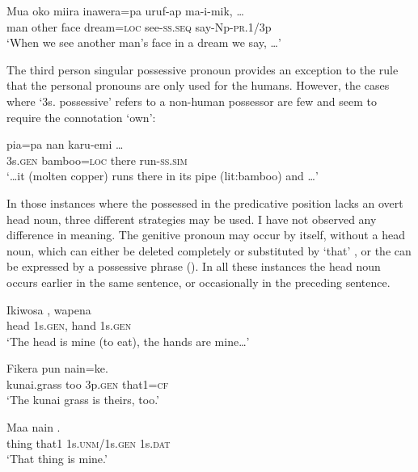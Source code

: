 \ea%
\label{ex:3:x575}
\gll Mua oko miira inawera=pa uruf-ap ma-i-mik, {\dots} \\
man other face dream=\textsc{loc} see-\textsc{ss}.\textsc{seq} say-Np-\textsc{pr}.1/3p\\
\glt`When we see another man's face in a dream we say, {\dots}'
\z

The third person singular possessive pronoun provides an exception to the rule that the personal pronouns are only used for the humans. However, the cases where  `3s. possessive' refers to a non-human possessor are few and seem to require the connotation `own':

\ea%
\label{ex:3:x1808}
\gll {\dots} pia=pa nan karu-emi {\dots} \\
3s.\textsc{gen} bamboo=\textsc{loc} there run-\textsc{ss}.\textsc{sim} \\
\glt`{\dots}it (molten copper) runs there in its pipe (lit:bamboo) and {\dots}'
\z

In those instances where the possessed  in the predicative position lacks an overt head noun, three different strategies may be used. I have not observed any difference in meaning. The genitive pronoun may occur by itself, without a head noun, which can either be deleted completely  or substituted by  `that' , or the  can be expressed by a possessive phrase  (). In all these instances the head noun occurs earlier in the same sentence, or occasionally in the preceding sentence. 

\ea%
\label{ex:3:x576}
\gll Ikiwosa , wapena  \\
head 1s.\textsc{gen}, hand 1s.\textsc{gen}\\
\glt`The head is mine (to eat), the hands are mine{\dots}'
\z

\ea%
\label{ex:3:x577}
\gll Fikera pun  nain=ke. \\
kunai.grass too 3p.\textsc{gen} that1=\textsc{cf}\\
\glt`The kunai grass is theirs, too.'
\z

\ea%
\label{ex:3:x578}
\gll Maa nain  . \\
thing that1 1s.\textsc{unm}/1s.\textsc{gen} 1s.\textsc{dat}\\
\glt`That thing is mine.'
\z


